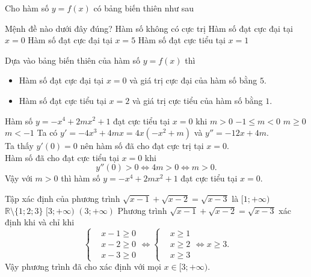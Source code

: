 \begin{ex}%
	Cho hàm số $y=f(x)$ có bảng biến thiên như sau
	\begin{center}
	\end{center}
	Mệnh đề nào dưới đây đúng?
	\choice
	{Hàm số không có cực trị}
	{\True Hàm số đạt cực đại tại $x=0$}
	{Hàm số đạt cực đại tại $x=5$}
	{Hàm số đạt cực tiểu tại $x=1$}
	\loigiai
	{
		Dựa vào bảng biến thiên của hàm số $y=f(x)$ thì
		\begin{itemize}
			\item Hàm số đạt cực đại tại $x=0$ và giá trị cực đại của hàm số bằng $5$.
			\item Hàm số đạt cực tiểu tại $x=2$ và giá trị cực tiểu của hàm số bằng $1$.
		\end{itemize}
	}
\end{ex}

\begin{ex}%
	Hàm số $y=-x^4+2mx^2+1$ đạt cực tiểu tại $x=0$ khi
	\choice
	{\True $m>0$}
	{$-1\leq m<0$}
	{$m\geq 0$}
	{$m<-1$}
	\loigiai
	{
		Ta có $y'=-4x^3+4mx = 4x\left(-x^2+m\right)$ và $y''=-12x+4m$.\\
		Ta thấy $y'(0)=0$ nên hàm số đã cho đạt cực trị tại $x=0$.\\
		Hàm số đã cho đạt cực tiểu tại $x=0$ khi
		\[y''(0)>0 \Leftrightarrow 4m>0 \Leftrightarrow m>0.\]
		Vậy với $m>0$ thì hàm số $y=-x^4+2mx^2+1$ đạt cực tiểu tại $x=0$.
	}
\end{ex}

\begin{ex}%
	Tập xác định của phương trình $\sqrt{x-1}+\sqrt{x-2}=\sqrt{x-3}$ là
	\choice
	{$[1;+\infty)$}
	{$\mathbb{R}\setminus\{1;2;3\}$}
	{\True $[3;+\infty)$}
	{$(3;+\infty)$}
	\loigiai
	{
		Phương trình $\sqrt{x-1}+\sqrt{x-2}=\sqrt{x-3}$ xác định khi và chỉ khi
		\[\left\{\begin{aligned}&x-1\geq 0 \\&x-2\geq 0 \\&x-3\geq 0\end{aligned}\right. \Leftrightarrow \left\{\begin{aligned}&x\geq 1 \\&x\geq 2 \\&x\geq 3\end{aligned}\right. \Leftrightarrow x\geq 3.\]
		Vậy phương trình đã cho xác định với mọi $x\in [3;+\infty)$.
	}
\end{ex}


